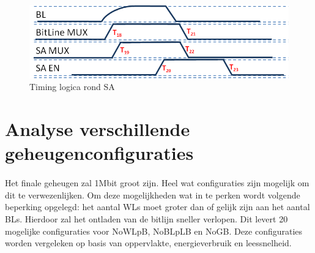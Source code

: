 \begin{figure}[!ht]
  \centering
  \includegraphics[scale=0.9]{../fig/hfdstk-timing-sa2.png}
  \caption[SA:timing]{Timing logica rond SA}
  \label{fig:sa_timing2}
\end{figure}

\section{Analyse verschillende geheugenconfiguraties}
\paragraph{}
Het finale geheugen zal 1Mbit groot zijn. Heel wat configuraties zijn mogelijk om dit te verwezenlijken. Om deze mogelijkheden wat in te perken wordt volgende beperking opgelegd: het aantal WLs moet groter dan of gelijk zijn aan het aantal BLs. Hierdoor zal het ontladen van de bitlijn sneller verlopen. Dit levert 20 mogelijke configuraties voor NoWLpB, NoBLpLB en NoGB. Deze configuraties worden vergeleken op basis van oppervlakte, energieverbruik en leessnelheid. 

